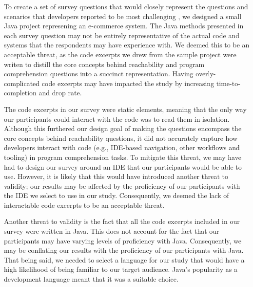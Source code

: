 
\par To create a set of survey questions that would closely represent the
questions and scenarios that developers reported to be most challenging
\cite{latoza-2010-hard-questions, latoza-2010-reach}, we designed a small Java
project represening an e-commerce system.
The Java methods presented in each survey question may not be entirely
representative of the actual code and systems that the respondents may have
experience with.
We deemed this to be an acceptable threat, as the code excerpts we drew from
the sample project were writen to distill the core concepts behind
reachability and program comprehension questions into a succinct representation.
Having overly-complicated code excerpts may have impacted the study by
increasing time-to-completion and drop rate.

\par The code excerpts in our survey were static elements, meaning that the
only way our participants could interact with the code was to read them
in isolation.
Although this furthered our design goal of making the questions encompass
the core concepts behind reachability questions, it did not accurately
capture how developers interact with code (e.g., IDE-based navigation, 
other workflows and tooling) in program comprehension tasks.
To mitigate this threat, we may have had to design our survey around an IDE 
that our participants would be able to use.
However, it is likely that this would have introduced another threat to
validity; our results may be affected by the proficiency of our participants
with the IDE we select to use in our study.
Consequently, we deemed the lack of interactable code excerpts to be an 
acceptable threat.

\par Another threat to validity is the fact that all the code
excerpts included in our survey were written in Java.
This does not account for the fact that our participants may have varying
levels of proficiency with Java.
Consequently, we may be conflating our results with the proficiency of our
participants with Java.
That being said, we needed to select a language for our study that would
have a high likelihood of being familiar to our target audience.
Java's popularity as a development language 
\cite{so-2021-dev-survey, jetbrains-2021-dev-survey} meant that it was a 
suitable choice.

\endinput


